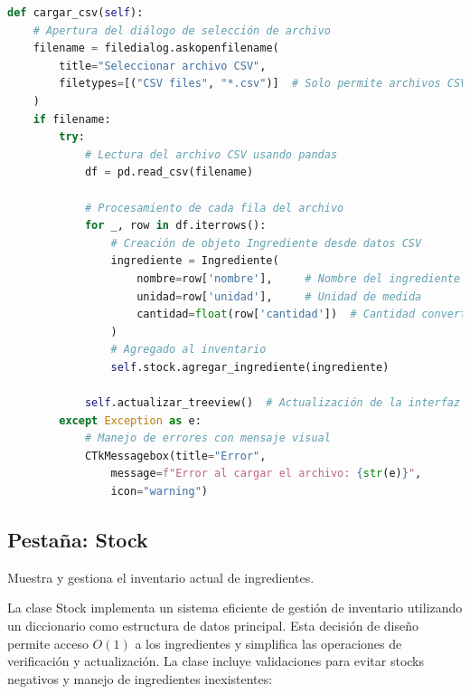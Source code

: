 \documentclass[12pt,letterpaper]{article}
\begin{document}
\begin{lstlisting}[language=Python, caption=Implementación de Carga CSV]
def cargar_csv(self):
    # Apertura del diálogo de selección de archivo
    filename = filedialog.askopenfilename(
        title="Seleccionar archivo CSV",
        filetypes=[("CSV files", "*.csv")]  # Solo permite archivos CSV
    )
    if filename:
        try:
            # Lectura del archivo CSV usando pandas
            df = pd.read_csv(filename)
            
            # Procesamiento de cada fila del archivo
            for _, row in df.iterrows():
                # Creación de objeto Ingrediente desde datos CSV
                ingrediente = Ingrediente(
                    nombre=row['nombre'],     # Nombre del ingrediente
                    unidad=row['unidad'],     # Unidad de medida
                    cantidad=float(row['cantidad'])  # Cantidad convertida a float
                )
                # Agregado al inventario
                self.stock.agregar_ingrediente(ingrediente)
            
            self.actualizar_treeview()  # Actualización de la interfaz
        except Exception as e:
            # Manejo de errores con mensaje visual
            CTkMessagebox(title="Error", 
                message=f"Error al cargar el archivo: {str(e)}", 
                icon="warning")
\end{lstlisting}

\subsection{Pestaña: Stock}
Muestra y gestiona el inventario actual de ingredientes.

La clase Stock implementa un sistema eficiente de gestión de inventario utilizando un diccionario como estructura de datos principal\@. Esta decisión de diseño permite acceso $O(1)$ a los ingredientes y simplifica las operaciones de verificación y actualización. La clase incluye validaciones para evitar stocks negativos y manejo de ingredientes inexistentes:
\end{document}
